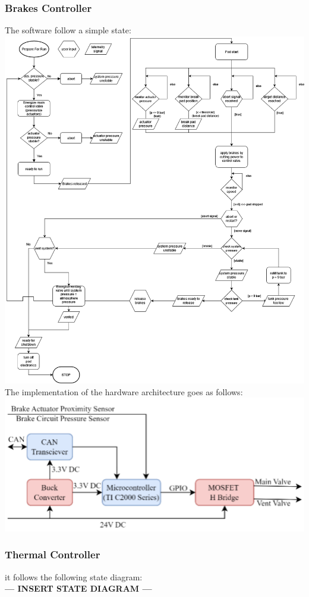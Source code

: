 \subsubsection{Brakes Controller}
The software follow a simple state: \\
\includegraphics[width=\textwidth]{texfiles/elec/eimg/brakesoftware_ext}
The implementation of the hardware architecture goes as follows:
\includegraphics[width=\textwidth]{texfiles/elec/eimg/Brakes_architecture}

\subsubsection{Thermal Controller}
it follows the following state diagram: \\
\textbf{--- INSERT STATE DIAGRAM ---}

